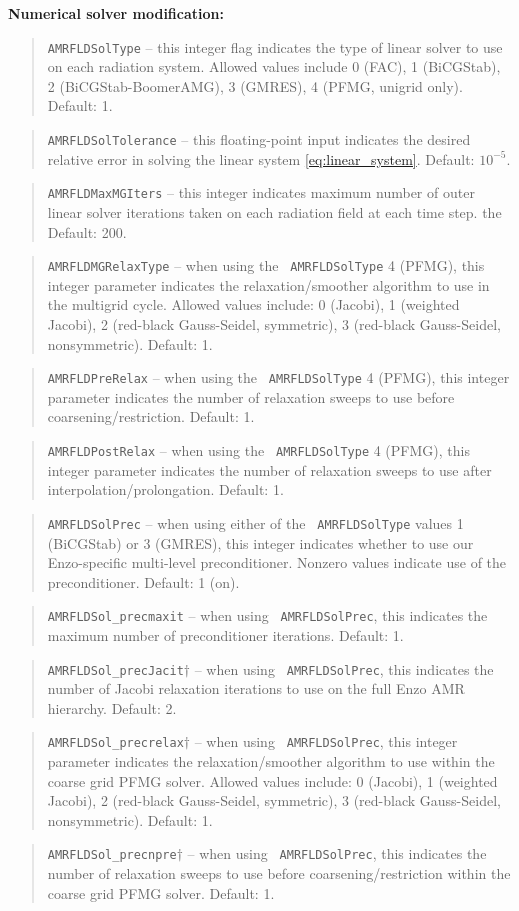 \documentclass[10pt]{article}
\renewcommand{\(}{\left(}
\renewcommand{\)}{\right)}
\begin{document}
{\bf Numerical solver modification:}

\blockquote{{\tt AMRFLDSolType} -- this integer flag indicates the
  type of linear solver to use on each radiation system.  Allowed
  values include 0 (FAC), 1 (BiCGStab), 2 (BiCGStab-BoomerAMG), 3
  (GMRES), 4 (PFMG, unigrid only).  Default: 1.}
%
\blockquote{{\tt AMRFLDSolTolerance} -- this floating-point input
  indicates the desired relative error in solving the linear system
  \eqref{eq:linear_system}.  Default: $10^{-5}$.}
%
\blockquote{{\tt AMRFLDMaxMGIters} -- this integer indicates maximum
  number of outer linear solver iterations taken on each radiation
  field at each time step.  the Default: 200.}
%
\blockquote{{\tt AMRFLDMGRelaxType} -- when using the {\tt
    AMRFLDSolType} 4 (PFMG), this integer parameter indicates the 
  relaxation/smoother algorithm to use in the multigrid cycle.  Allowed values
  include: 0 (Jacobi), 1 (weighted Jacobi), 2 (red-black Gauss-Seidel,
  symmetric), 3 (red-black Gauss-Seidel, nonsymmetric).  Default: 1.}
%
\blockquote{{\tt AMRFLDPreRelax} -- when using the {\tt
    AMRFLDSolType} 4 (PFMG), this integer parameter indicates the
  number of relaxation sweeps to use before coarsening/restriction.
  Default: 1.} 
%
\blockquote{{\tt AMRFLDPostRelax} -- when using the {\tt
    AMRFLDSolType} 4 (PFMG), this integer parameter indicates the
  number of relaxation sweeps to use after interpolation/prolongation.
  Default: 1.}
%
\blockquote{{\tt AMRFLDSolPrec} -- when using either of the {\tt
    AMRFLDSolType} values 1 (BiCGStab) or 3 (GMRES), this integer
  indicates whether to use our Enzo-specific multi-level
  preconditioner.  Nonzero values indicate use of the preconditioner.
  Default: 1 (on).}
%
\blockquote{{\tt AMRFLDSol\_precmaxit} -- when using {\tt
    AMRFLDSolPrec}, this indicates the maximum number of
  preconditioner iterations.  Default: 1.}
%
\blockquote{{\tt AMRFLDSol\_precJacit}$\dagger$ -- when using {\tt
    AMRFLDSolPrec}, this indicates the number of Jacobi relaxation
  iterations to use on the full Enzo AMR hierarchy.  Default: 2.}
%
\blockquote{{\tt AMRFLDSol\_precrelax}$\dagger$ --  when using {\tt
    AMRFLDSolPrec}, this integer parameter indicates the
  relaxation/smoother algorithm to use within the coarse grid PFMG solver.
  Allowed values include: 0 (Jacobi), 1 (weighted Jacobi), 2 (red-black Gauss-Seidel,
  symmetric), 3 (red-black Gauss-Seidel, nonsymmetric).  Default: 1.}
%
\blockquote{{\tt AMRFLDSol\_precnpre}$\dagger$ -- when using {\tt
    AMRFLDSolPrec}, this indicates the number of relaxation sweeps to
  use before coarsening/restriction within the coarse grid PFMG
  solver.  Default: 1.} 
\end{document}
